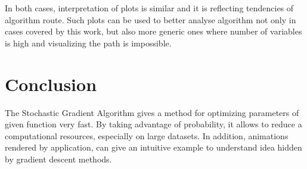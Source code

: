 \documentclass[11pt,a4paper]{IEEEtran}
\begin{document}
In both cases, interpretation of plots is similar and it is reflecting tendencies of algorithm route. Such plots can be used to better analyse algorithm not only in cases covered by this work, but also more generic ones where number of variables is high and visualizing the path is impossible.

\section{Conclusion}
The Stochastic Gradient Algorithm gives a method for optimizing parameters of given function very fast. By taking advantage of probability, it allows to reduce a computational resources, especially on large datasets. In addition, animations rendered by application, can give an intuitive example to understand idea hidden by gradient descent methods.

{}

\end{document}
